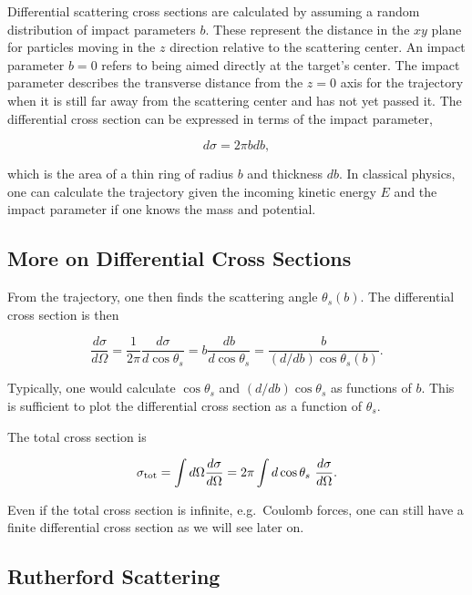\documentclass[%
oneside,                 %
final,                   %
10pt]{article}
\begin{document}
Differential scattering cross sections are calculated by assuming a
random distribution of impact parameters $b$. These represent the
distance in the $xy$ plane for particles moving in the $z$ direction
relative to the scattering center. An impact parameter $b=0$ refers to
being aimed directly at the target's center. The impact parameter
describes the transverse distance from the $z=0$ axis for the
trajectory when it is still far away from the scattering center and
has not yet passed it. The differential cross section can be expressed
in terms of the impact parameter,

\begin{equation}
d\sigma=2\pi bdb,
\end{equation}

which is the area of a thin ring of radius $b$ and thickness $db$. In
classical physics, one can calculate the trajectory given the incoming
kinetic energy $E$ and the impact parameter if one knows the mass and
potential.

\subsection*{More on Differential  Cross Sections}

From the trajectory, one then finds the scattering angle
$\theta_s(b)$. The differential cross section is then

\begin{equation}
\frac{d\sigma}{d\Omega}=\frac{1}{2\pi}\frac{d\sigma}{d\cos\theta_s}=b\frac{db}{d\cos\theta_s}=\frac{b}{(d/db)\cos\theta_s(b)}.
\end{equation}

Typically, one would calculate $\cos\theta_s$ and $(d/db)\cos\theta_s$
as functions of $b$. This is sufficient to plot the differential cross
section as a function of $\theta_s$.

The total cross section is 

\begin{equation}
\sigma_{\rm tot}=\int d\Omega\frac{d\sigma}{d\Omega}=2\pi\int d\cos\theta_s~\frac{d\sigma}{d\Omega}. 
\end{equation}

Even if the total cross section is infinite, e.g.~Coulomb forces, one
can still have a finite differential cross section as we will see
later on.

\subsection*{Rutherford Scattering}
\end{document}
